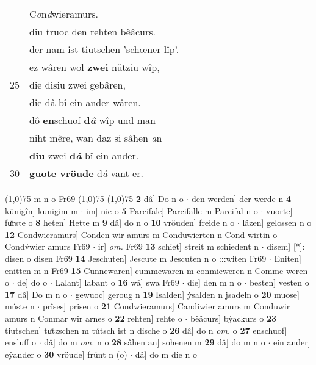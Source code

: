 \documentclass[8pt,a4paper,notitlepage]{article}
\begin{document}
\begin{table}[ht]
\begin{minipage}[t]{0.5\linewidth}
\begin{tabular}{rl}
 & C\textit{o}n\textit{d}wieramurs.\\ 
 & diu truoc den rehten bêâcurs.\\ 
 & der nam ist tiutschen 'schœner lîp'.\\ 
 & ez wâren wol \textbf{zwei} nütziu wîp,\\ 
25 & die disiu zwei gebâren,\\ 
 & die dâ bî ein ander wâren.\\ 
 & dô \textbf{en}schuof \textbf{d\textit{â}} wîp und man\\ 
 & niht mêre, wan daz si sâhen \textit{a}n\\ 
 & \textbf{diu} zwei \textbf{d\textit{â}} bî ein ander.\\ 
30 & \textbf{guote vröude} d\textit{â} vant er.\\ 
\end{tabular}
\scriptsize
\line(1,0){75} \newline
m n o Fr69 \newline
\line(1,0){75} \newline
\newline
\line(1,0){75} \newline
\textbf{2} dâ] Do n o  $\cdot$ den werden] der werde n \textbf{4} künigîn] kunigim m  $\cdot$ im] nie o \textbf{5} Parcifale] Parcifalle m Parcifal n o  $\cdot$ vuorte] fuͯrste o \textbf{8} heten] Hette m \textbf{9} dâ] do n o \textbf{10} vröuden] freide n o  $\cdot$ lâzen] gelossen n o \textbf{12} Condwieramurs] Conden wir amurs m Conduwierten n Cond wirtin o Condv́wier amurs Fr69  $\cdot$ ir] \textit{om.} Fr69 \textbf{13} schiet] streit m schiedent n  $\cdot$ disem] [*]: disen o disen Fr69 \textbf{14} Jeschuten] Jescute m Jescuten n o :::witen Fr69  $\cdot$ Eniten] enitten m n Fr69 \textbf{15} Cunnewaren] cummewaren m conmieweren n Comme weren o  $\cdot$ de] do o  $\cdot$ Lalant] labant o \textbf{16} wâ] swa Fr69  $\cdot$ die] den m n o  $\cdot$ besten] vesten o \textbf{17} dâ] Do m n o  $\cdot$ gewuoc] geroug n \textbf{19} Isalden] ẏsalden n jsadeln o \textbf{20} muose] múste n  $\cdot$ prîses] prisen o \textbf{21} Condwieramurs] Candiwier amurs m Conduwir amurs n Conmar wir arnes o \textbf{22} rehten] rehte o  $\cdot$ bêâcurs] bẏackurs o \textbf{23} tiutschen] tuͯtzschen m tútsch ist n dische o \textbf{26} dâ] do n \textit{om.} o \textbf{27} enschuof] ensluff o  $\cdot$ dâ] do m \textit{om.} n o \textbf{28} sâhen an] sohenen m \textbf{29} dâ] do m n o  $\cdot$ ein ander] eẏander o \textbf{30} vröude] frúnt n (o)  $\cdot$ dâ] do m die n o \newline
\end{minipage}
\end{table}
\end{document}
